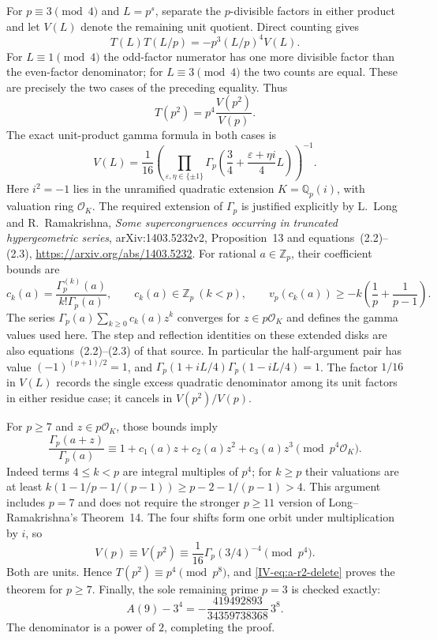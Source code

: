 \documentclass[11pt,letterpaper]{article}
\numberwithin{equation}{section}
\begin{document}
For $p\equiv3\pmod4$ and $L=p^s$, separate the $p$-divisible
factors in either product and let $V(L)$ denote the remaining unit
quotient. Direct counting gives
\[
 T(L)T(L/p)=-p^3(L/p)^4V(L).
\]
For $L\equiv1\pmod4$ the odd-factor numerator has one more divisible
factor than the even-factor denominator; for $L\equiv3\pmod4$
the two counts are equal. These are precisely the two cases of the
preceding equality. Thus
\[
 T(p^2)=p^4\frac{V(p^2)}{V(p)}.
\]
The exact unit-product gamma formula in both cases is
\[
 V(L)=\frac1{16}\left(
 \prod_{\varepsilon,\eta\in\{\pm1\}}
 \Gamma_p\left(\frac34+\frac{\varepsilon+\eta i}{4}L\right)
 \right)^{-1}.
\]
Here $i^2=-1$ lies in the unramified quadratic extension
$K=\mathbb Q_p(i)$, with valuation ring $\mathcal O_K$. The required
extension of $\Gamma_p$ is justified explicitly by
L.~Long and R.~Ramakrishna, \emph{Some supercongruences occurring in
truncated hypergeometric series}, arXiv:1403.5232v2, Proposition~13
and equations~(2.2)--(2.3),
\url{https://arxiv.org/abs/1403.5232}.
For rational $a\in\mathbb Z_p$, their coefficient bounds are
\[
 c_k(a)=\frac{\Gamma_p^{(k)}(a)}{k!\Gamma_p(a)},\qquad
 c_k(a)\in\mathbb Z_p\ (k<p),\qquad
 v_p(c_k(a))\ge-k\left(\frac1p+\frac1{p-1}\right).
\]
The series $\Gamma_p(a)\sum_{k\ge0}c_k(a)z^k$ converges for
$z\in p\mathcal O_K$ and defines the gamma values used here.
The step and reflection identities on these extended disks are
also equations~(2.2)--(2.3) of that source. In particular the
half-argument pair has value $(-1)^{(p+1)/2}=1$, and
$\Gamma_p(1+iL/4)\Gamma_p(1-iL/4)=1$. The factor $1/16$ in $V(L)$
records the single excess quadratic denominator among its unit
factors in either residue case; it cancels in $V(p^2)/V(p)$.

For $p\ge7$ and $z\in p\mathcal O_K$, those bounds imply
\[
 \frac{\Gamma_p(a+z)}{\Gamma_p(a)}
 \equiv1+c_1(a)z+c_2(a)z^2+c_3(a)z^3
 \pmod{p^4\mathcal O_K}.
\]
Indeed terms $4\le k<p$ are integral multiples of $p^4$;
for $k\ge p$ their valuations are at least
$k(1-1/p-1/(p-1))\ge p-2-1/(p-1)>4$.
This argument includes $p=7$ and does not require the stronger
$p\ge11$ version of Long--Ramakrishna's Theorem~14.
The four shifts form one orbit under multiplication by $i$, so
\[
 V(p)\equiv V(p^2)\equiv\frac1{16}\Gamma_p(3/4)^{-4}\pmod{p^4}.
\]
Both are units. Hence $T(p^2)\equiv p^4\pmod{p^8}$, and
\eqref{IV-eq:a-r2-delete} proves the theorem for $p\ge7$.
Finally, the sole remaining prime $p=3$ is checked exactly:
\[
 A(9)-3^4=-\frac{419492893}{34359738368}\,3^8.
\]
The denominator is a power of $2$, completing the proof.
\end{document}
